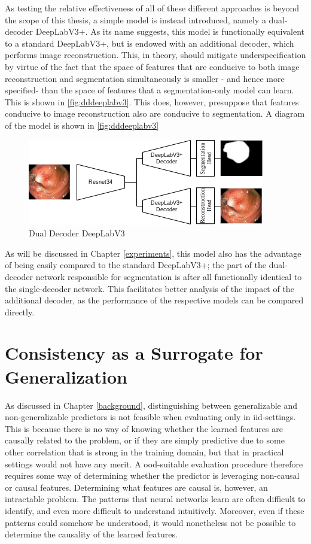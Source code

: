 As testing the relative effectiveness of all of these different approaches is beyond the scope of this thesis, a simple model is instead introduced, namely a dual-decoder DeepLabV3+. As its name suggests, this model is functionally equivalent to a standard DeepLabV3+, but is endowed with an additional decoder, which performs image reconstruction. This, in theory, should mitigate underspecification by virtue of the fact that the space of features that are conducive to both image reconstruction and segmentation simultaneously is smaller - and hence more specified- than the space of features that a segmentation-only model can learn. This is shown in \autoref{fig:dddeeplabv3}. This does, however, presuppose that features conducive to image reconstruction also are conducive to segmentation. A diagram of the model is shown in \autoref{fig:dddeeplabv3}
\begin{figure}[ht]
    \centering
    \includegraphics[width=\linewidth]{illustrations/InductiveNet.png}
    \caption{Dual Decoder DeepLabV3}
    \label{fig:dddeeplabv3}
\end{figure}

As will be discussed in Chapter \ref{experiments}, this model also has the advantage of being easily compared to the standard DeepLabV3+; the part of the dual-decoder network responsible for segmentation is after all functionally identical to the single-decoder network.  This facilitates better analysis of the impact of the additional decoder, as the performance of the respective models can be compared directly. 



\section{Consistency as a Surrogate for Generalization}
As discussed in Chapter \ref{background}, distinguishing between generalizable and non-generalizable predictors is not feasible when evaluating only in iid-settings. This is because there is no way of knowing whether the learned features are causally related to the problem, or if they are simply predictive due to some other correlation that is strong in the training domain, but that in practical settings would not have any merit. A \gls{ood}-suitable evaluation procedure therefore requires some way of determining whether the predictor is leveraging non-causal or causal features. Determining what features are causal is, however, an intractable problem. The patterns that neural networks learn are often difficult to identify, and even more difficult to understand intuitively. Moreover, even if these patterns could somehow be understood, it would nonetheless not be possible to determine the causality of the learned features. 

